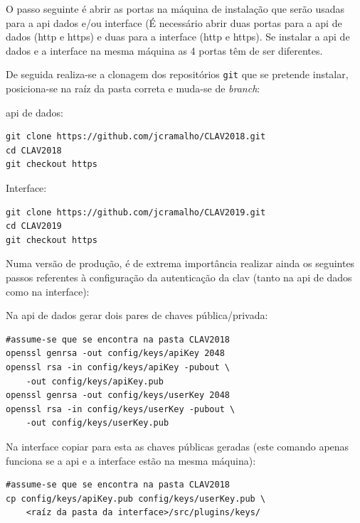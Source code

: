 O passo seguinte é abrir as portas na máquina de instalação que serão usadas para a \acrshort{api} dados e/ou interface (É necessário abrir duas portas para a \acrshort{api} de dados (\acrshort{http} e \acrshort{https}) e duas para a interface (\acrshort{http} e \acrshort{https}). Se instalar a \acrshort{api} de dados e a interface na mesma máquina as 4 portas têm de ser diferentes.

De seguida realiza-se a clonagem dos repositórios \texttt{git} que se pretende instalar, posiciona-se na raíz da pasta correta e muda-se de \textit{branch}:

\footnotesize
\begin{center}
\begin{minipage}{0.49\textwidth}
\acrshort{api} de dados:
\begin{verbatim}
git clone https://github.com/jcramalho/CLAV2018.git
cd CLAV2018
git checkout https
\end{verbatim}
\end{minipage}%
\begin{minipage}{0.49\textwidth}
Interface:
\begin{verbatim}
git clone https://github.com/jcramalho/CLAV2019.git
cd CLAV2019
git checkout https
\end{verbatim}
\end{minipage}
\end{center}
\normalsize

Numa versão de produção, é de extrema importância realizar ainda os seguintes passos referentes à configuração da autenticação da \acrshort{clav} (tanto na \acrshort{api} de dados como na interface):

\footnotesize
\begin{center}
\begin{minipage}[t]{0.49\textwidth}
Na \acrshort{api} de dados gerar dois pares de chaves pública/privada:
\begin{verbatim}
#assume-se que se encontra na pasta CLAV2018 
openssl genrsa -out config/keys/apiKey 2048
openssl rsa -in config/keys/apiKey -pubout \
    -out config/keys/apiKey.pub
openssl genrsa -out config/keys/userKey 2048
openssl rsa -in config/keys/userKey -pubout \
    -out config/keys/userKey.pub
\end{verbatim}
\end{minipage}%
\begin{minipage}[t]{0.49\textwidth}
Na interface copiar para esta as chaves públicas geradas (este comando apenas funciona se a \acrshort{api} e a interface estão na mesma máquina):
\begin{verbatim}
#assume-se que se encontra na pasta CLAV2018 
cp config/keys/apiKey.pub config/keys/userKey.pub \
    <raíz da pasta da interface>/src/plugins/keys/
\end{verbatim}
\end{minipage}
\end{center}
\normalsize

